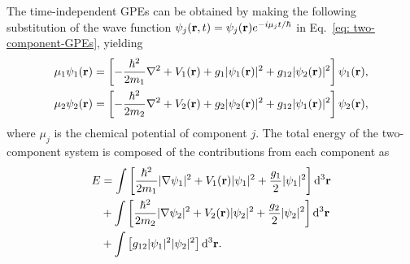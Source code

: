 The time-independent GPEs can be obtained by making the following substitution
of the wave function \(\psi_j(\vb{r}, t)=\psi_j(\vb{r})e^{-i\mu_j t/\hbar}\) in
Eq.~\eqref{eq: two-component-GPEs}, yielding
\begin{equation}\label{eq: time-indep-two-component-GPEs}
    \begin{aligned}
        \mu_1\psi_1(\vb{r}) & =
        \left[-\frac{\hbar^2}{2m_1}\nabla^2 + V_1(\vb{r})
            + g_1|\psi_1(\vb{r})|^2
        + g_{12}|\psi_2(\vb{r})|^2\right]\psi_1(\vb{r}), \\
        \mu_2\psi_2(\vb{r}) & =
        \left[-\frac{\hbar^2}{2m_2}\nabla^2 + V_2(\vb{r})
            + g_2|\psi_2(\vb{r})|^2
            + g_{12}|\psi_1(\vb{r})|^2\right]\psi_2(\vb{r}),
    \end{aligned}
\end{equation}
where \(\mu_j\) is the chemical potential of component \(j\).
The total energy of the two-component system is composed of the contributions
from each component as
\begin{equation}
    \begin{aligned}
        E & = \int \left[\frac{\hbar^2}{2m_1}|\nabla\psi_1|^2
        + V_1(\vb{r})|\psi_1|^2 + \frac{g_1}{2}|\psi_1|^2 \right] \dd^3\vb{r} \\
          & + \int \left[\frac{\hbar^2}{2m_2}|\nabla\psi_2|^2
        + V_2(\vb{r})|\psi_2|^2 + \frac{g_2}{2}|\psi_2|^2 \right] \dd^3\vb{r} \\
          & + \int \left[g_{12}|\psi_1|^2|\psi_2|^2\right] \dd^3\vb{r}.
    \end{aligned}
\end{equation}

